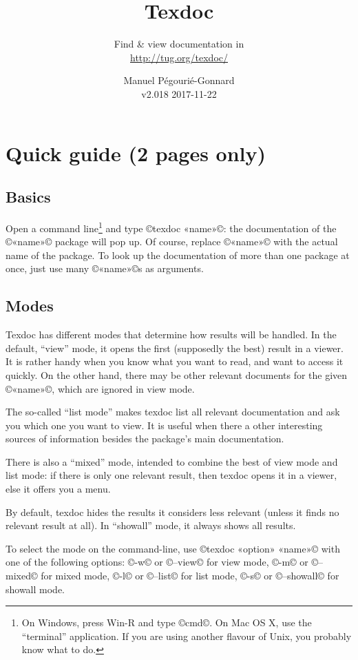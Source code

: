 \documentclass[a4paper, oneside]{scrartcl}
\title{Texdoc}
\subtitle{Find \& view documentation in \texlive\\
  \href{http://tug.org/texdoc/}{http://tug.org/texdoc/}\\
  \tdml}
\author{Manuel Pégourié-Gonnard\\
  v2.018 2017-11-22}
\date{}
\begin{document}
\VerbatimFootnotes

\maketitle

\section{Quick guide (2 pages only)}

\subsection{Basics}

Open a command line\footnote{On Windows, press Win-R and type ©cmd©.  On Mac
  OS X, use the ``terminal'' application.  If you are using another flavour of
  Unix, you probably know what to do.} and type ©texdoc «name»©: the
documentation of the ©«name»© package will pop up. Of course, replace ©«name»©
with the actual name of the package.  To look up the documentation of more
than one package at once, just use many ©«name»©s as arguments.

\subsection{Modes}\label{ss-modes}

Texdoc has different modes that determine how results will be handled. In the
default, ``view'' mode, it opens the first (supposedly the best) result in a
viewer. It is rather handy when you know what you want to read, and want to
access it quickly. On the other hand, there may be other relevant documents
for the given ©«name»©, which are ignored in view mode.

The so-called ``list mode'' makes texdoc list all relevant documentation and
ask you which one you want to view. It is useful when there a other
interesting sources of information besides the package's main documentation.

There is also a ``mixed'' mode, intended to combine the best of view mode and
list mode: if there is only one relevant result, then texdoc opens it in a
viewer, else it offers you a menu.

By default, texdoc hides the results it considers less relevant (unless it
finds no relevant result at all). In ``showall'' mode, it always shows all
results.

To select the mode on the command-line, use ©texdoc «option» «name»© with one
of the following options: ©-w© or ©--view© for view mode, ©-m© or ©--mixed©
for mixed mode, ©-l© or ©--list© for list mode, ©-s© or ©--showall© for
showall mode.
\end{document}
